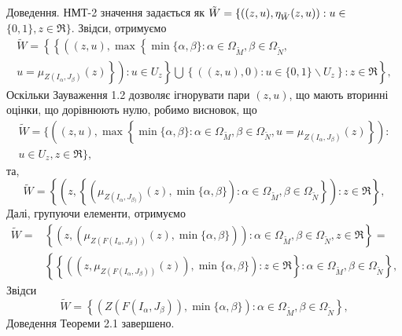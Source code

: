 \documentclass[14pt, a4paper, oneside]{extarticle}
\numberwithin{equation}{section}
\begin{document}
Доведення. НМТ-2 значення задається як $\tilde{W}=\left\{\left((z, u), \eta_{\tilde{W}}(z, u)\right):\\ u \in\right.$ $\{0,1\}, z \in \Re\}$. Звідси, отримуємо
\begin{equation*}
\begin{array}{l}
\tilde{W}=\left\{\left\{\left((z, u), \max \left\{\min \{\alpha, \beta\}: \alpha \in \Omega_{\tilde{M}}, \beta \in \Omega_{\tilde{N}},\right.\right.\right.\right. \\
\left.\left.\left.\left.u=\mu_{Z\left(I_{\alpha}, J_{\beta}\right)}(z)\right\}\right): u \in U_{z}\right\} \bigcup\left\{((z, u), 0): u \in\{0,1\} \backslash U_{z}\right\}: z \in \Re\right\} ,
\end{array}
\end{equation*}
Оскільки Зауваження 1.2 дозволяє ігнорувати пари $(z, u)$, що мають вторинні оцінки, що дорівнюють нулю, робимо висновок, що 
\begin{equation*}
\begin{array}{l}
    \tilde{W}=\{\left((z, u), \max \left\{\min \{\alpha, \beta\}: \alpha \in \Omega_{\tilde{M}}, \beta \in \Omega_{\tilde{N}}, u=\mu_{Z\left(I_{\alpha}, J_{\beta}\right)}(z)\right\}\right):\\
    u \in U_{z}, z \in \Re\},
\end{array}
\end{equation*}
та,
\begin{equation*}
\tilde{W}=\left\{\left(z,\left\{\left(\mu_{Z\left(I_{\alpha}, J_{\beta)}\right)}(z), \min \{\alpha, \beta\}\right): \alpha \in \Omega_{\tilde{M}}, \beta \in \Omega_{\tilde{N}}\right\}\right): z \in \Re\right\},
\end{equation*}
Далі, групуючи елементи, отримуємо
\begin{equation*}
\begin{aligned}
\tilde{W}= & \left\{\left(z,\left(\mu_{Z\left(F\left(I_{\alpha}, J_{\beta}\right)\right)}(z), \min \{\alpha, \beta\}\right)\right): \alpha \in \Omega_{\tilde{M}}, \beta \in \Omega_{\tilde{N}}, z \in \Re\right\}= \\
& \left\{\left\{\left(\left(z, \mu_{Z\left(F\left(I_{\alpha}, J_{\beta}\right)\right)}(z)\right), \min \{\alpha, \beta\}\right): z \in \Re\right\}: \alpha \in \Omega_{\tilde{M}}, \beta \in \Omega_{\tilde{N}}\right\} ,
\end{aligned}
\end{equation*}
Звідси
\begin{equation*}
\tilde{W}=\left\{\left(Z\left(F\left(I_{\alpha}, J_{\beta}\right)\right), \min \{\alpha, \beta\}\right): \alpha \in \Omega_{\tilde{M}}, \beta \in \Omega_{\tilde{N}}\right\},
\end{equation*}
Доведення Теореми 2.1 завершено.
\end{document}
